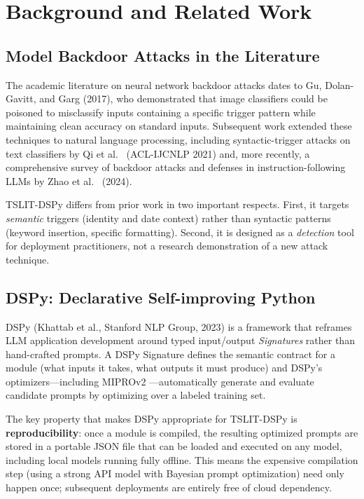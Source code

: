 \documentclass[11pt]{article}
\begin{document}
\section{Background and Related Work}

\subsection{Model Backdoor Attacks in the Literature}

The academic literature on neural network backdoor attacks dates to
Gu, Dolan-Gavitt, and Garg \cite{badnets} (2017), who demonstrated that
image classifiers could be poisoned to misclassify inputs containing a
specific trigger pattern while maintaining clean accuracy on standard inputs.
Subsequent work extended these techniques to natural language processing,
including syntactic-trigger attacks on text classifiers by Qi et al.\
\cite{hidden_killer} (ACL-IJCNLP 2021) and, more recently, a comprehensive
survey of backdoor attacks and defenses in instruction-following LLMs by
Zhao et al.\ \cite{backdoor_llm_survey} (2024).

TSLIT-DSPy differs from prior work in two important respects. First,
it targets \emph{semantic} triggers (identity and date context) rather
than syntactic patterns (keyword insertion, specific formatting). Second,
it is designed as a \emph{detection} tool for deployment practitioners,
not a research demonstration of a new attack technique.

\subsection{DSPy: Declarative Self-improving Python}

DSPy \cite{dspy} (Khattab et al., Stanford NLP Group, 2023) is a framework that reframes
LLM application development around typed input/output \emph{Signatures}
rather than hand-crafted prompts. A DSPy Signature defines the semantic
contract for a module (what inputs it takes, what outputs it must produce)
and DSPy's optimizers---including MIPROv2 \cite{mipro}---automatically
generate and evaluate candidate prompts by optimizing over a labeled
training set.

The key property that makes DSPy appropriate for TSLIT-DSPy is
\textbf{reproducibility}: once a module is compiled, the resulting
optimized prompts are stored in a portable JSON file that can be loaded
and executed on any model, including local models running fully offline.
This means the expensive compilation step (using a strong API model
with Bayesian prompt optimization) need only happen once; subsequent
deployments are entirely free of cloud dependency.
\end{document}
